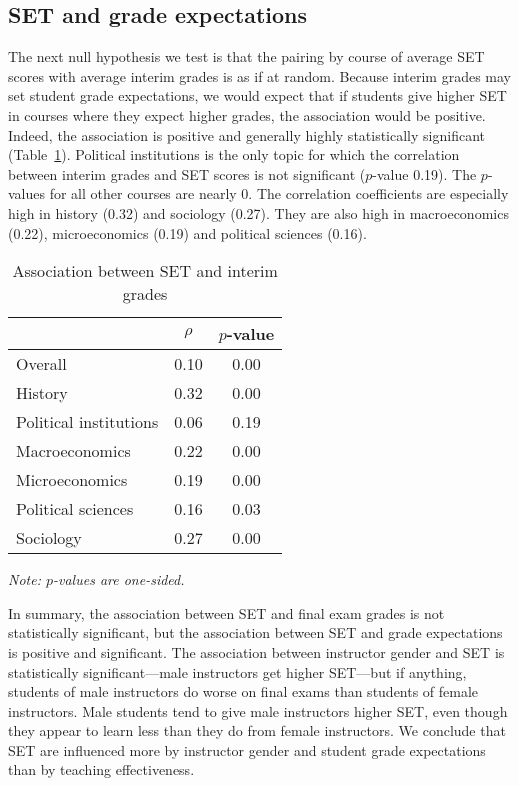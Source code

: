 \documentclass[12pt]{article}
\begin{document}
\subsection{SET and grade expectations}
The next null hypothesis we test is that the pairing by course of average SET scores with
average interim grades is as if at random.
Because interim grades may set student grade expectations, we would expect that if
students give higher SET in courses where they expect higher grades, the association
would be positive.
Indeed, the association is positive and generally highly statistically significant 
(Table~\ref{tab:instructor_gender}). 
Political institutions is the only topic for which the correlation between interim grades and 
SET scores is not significant ($p$-value 0.19). 
The $p$-values for all other courses are nearly 0. 
The correlation coefficients are especially high in history (0.32) and sociology (0.27). 
They are also high in macroeconomics (0.22), microeconomics (0.19) and political sciences (0.16).


\begin{table}[htbp]
  \centering
  \footnotesize 
  \caption{Association between SET and interim grades}
    \begin{tabular}{lcc}
    \toprule 
                          & $\rho$  & $p$-value  \\
   \midrule
    Overall &                 0.10       & 0.00   \\
    History &                 0.32       & 0.00   \\
    Political institutions &  0.06       & 0.19     \\
    Macroeconomics &          0.22       & 0.00    \\
    Microeconomics &          0.19       & 0.00     \\
    Political sciences &      0.16       & 0.03     \\
    Sociology &               0.27       & 0.00     \\
    \bottomrule
    \end{tabular}%
 \label{tab:instructor_gender}%
  
  \textit{Note: $p$-values are one-sided.}
\end{table}%
\normalsize

In summary, the association between SET and final exam grades is not statistically significant,
but the association between SET and grade expectations is positive and significant.
The association between instructor gender and SET is statistically significant---male instructors
get higher SET---but if anything, students of male instructors do worse on final exams
than students of female instructors.
Male students tend to give male instructors higher SET, even though they appear to learn less
than they do from female instructors.
We conclude that SET are influenced more by instructor gender and student grade expectations than
by teaching effectiveness.
\end{document}
